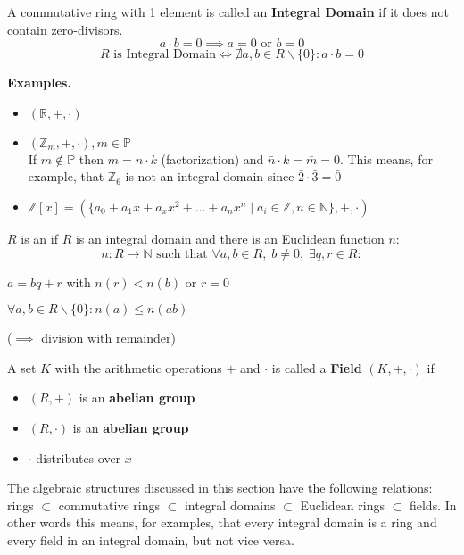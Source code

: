 \begin{definition}
A commutative ring with 1 element is called an \textbf{Integral Domain} if it does not contain zero-divisors.
\[a \cdot b = 0 \implies a=0 \text{ or } b=0\]
\[ R \text{ is Integral Domain} \Leftrightarrow  \nexists a,b \in R \backslash \{0\}: a \cdot b = 0\]
\end{definition}

\textbf{Examples.}
\begin{itemize}
\item $(\mathbb{R}, +, \cdot)$
\item $(\mathbb{Z}_m, + , \cdot), m \in \mathbb{P}$ \\
If $m\not\in \mathbb{P}$ then $m = n \cdot k$ (factorization) and $\bar{n} \cdot \bar{k} = \bar{m} = \bar{0}$.
This means, for example, that $\mathbb{Z}_6$ is not an integral domain since $\bar{2} \cdot \bar{3} = \bar{0}$ \\
\item $\mathbb{Z}[x] = (\{a_0 + a_1 x + a_x x^2 + \ldots + a_n x^n \mid a_i \in \mathbb{Z}, n \in \mathbb{N} \},+,\cdot)$
\end{itemize}

\begin{definition}
$R$ is an  if $R$ is an integral domain and there is an Euclidean function $n$:
\[
  n : R \rightarrow \mathbb{N} \text{ such that } \forall a,b \in R,\; b \neq 0,\; \exists q,r \in R:
\]
	\begin{compactenum}
	\item $a = bq + r$ with $n(r) < n(b)$ or $r = 0$
	\item $\forall a,b \in R \backslash \{0\} : n(a) \leq n(ab)$
	\end{compactenum}
	($\implies$ division with remainder)
\end{definition}


\begin{definition}
A set $K$ with the arithmetic operations $+$ and $\cdot$ is called a \textbf{Field} $(K,+,\cdot)$ if
\begin{itemize}
	\item $(R,+)$ is an \textbf{abelian group}
	\item $(R,\cdot)$ is an \textbf{abelian group}
	\item $\cdot$ distributes over $x$
\end{itemize}
\end{definition}

The algebraic structures discussed in this section have the following relations:
rings $\subset$ commutative rings $\subset$ integral domains $\subset$ Euclidean rings $\subset$ fields.
In other words this means, for examples, that every integral domain is a ring and every field in an integral domain, but not vice versa.
